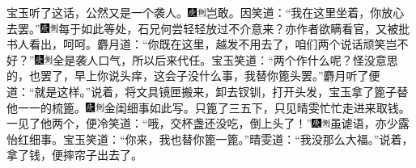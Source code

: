 宝玉听了这话，公然又是一个袭人。{\includegraphics[width=3mm]{../Images/00004}\includegraphics[width=3mm]{../Images/00011}\footnotesize \kaishu 岂敢。}因笑道：“我在这里坐着，你放心去罢。”{\includegraphics[width=3mm]{../Images/00004}\includegraphics[width=3mm]{../Images/00011}\footnotesize \kaishu 每于如此等处，石兄何尝轻轻放过不介意来？亦作者欲瞒看官，又被批书人看出，呵呵。}麝月道：“你既在这里，越发不用去了，咱们两个说话顽笑岂不好？”{\includegraphics[width=3mm]{../Images/00004}\includegraphics[width=3mm]{../Images/00011}\footnotesize \kaishu 全是袭人口气，所以后来代任。}宝玉笑道：“两个作什么呢？怪没意思的，也罢了，早上你说头痒，这会子没什么事，我替你篦头罢。”麝月听了便道：“就是这样。”说着，将文具镜匣搬来，卸去钗钏，打开头发，宝玉拿了篦子替他一一的梳篦。{\includegraphics[width=3mm]{../Images/00004}\includegraphics[width=3mm]{../Images/00011}\footnotesize \kaishu 金闺细事如此写。}只篦了三五下，只见晴雯忙忙走进来取钱。一见了他两个，便冷笑道：“哦，交杯盏还没吃，倒上头了！”{\includegraphics[width=3mm]{../Images/00004}\includegraphics[width=3mm]{../Images/00011}\footnotesize \kaishu 虽谑语，亦少露怡红细事。}宝玉笑道：“你来，我也替你篦一篦。”晴雯道：“我没那么大福。”说着，拿了钱，便摔帘子出去了。

